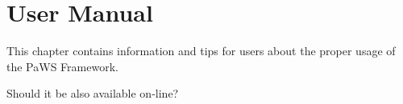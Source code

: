 \chapter{User Manual}

This chapter contains information and tips for users about the proper
usage of the PaWS Framework.

Should it be also available on-line?






